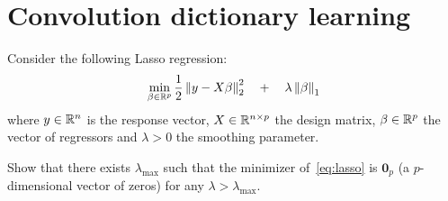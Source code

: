 \documentclass[11pt]{article}
\begin{document}
\section{Convolution dictionary learning}

\begin{exercise}
Consider the following Lasso regression:
\begin{equation}\label{eq:lasso}
    \min_{\beta\in\mathbb{R}^p} \frac{1}{2}\left\lVert y-X\beta\right\rVert^2_2 \quad + \quad \lambda \left\lVert\beta\right\rVert_1
\end{equation}
where $y\in\mathbb{R}^n$ is the response vector, $X\in\mathbb{R}^{n\times p}$ the design matrix, $\beta\in\mathbb{R}^p$ the vector of regressors and $\lambda>0$ the smoothing parameter.

Show that there exists $\lambda_{\max}$ such that the minimizer of~\eqref{eq:lasso} is $\mathbf{0}_p$ (a $p$-dimensional vector of zeros) for any $\lambda > \lambda_{\max}$.
\end{exercise}
\end{document}
